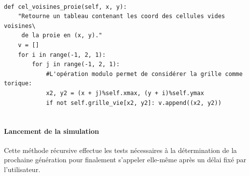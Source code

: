\documentclass[11pt]{article}
\begin{document}
\begin{verbatim}

def cel_voisines_proie(self, x, y):
    "Retourne un tableau contenant les coord des cellules vides voisines\
     de la proie en (x, y)."
    v = []
    for i in range(-1, 2, 1):
        for j in range(-1, 2, 1):
            #L'opération modulo permet de considérer la grille comme torique:
            x2, y2 = (x + j)%self.xmax, (y + i)%self.ymax      
            if not self.grille_vie[x2, y2]: v.append((x2, y2))
                
\end{verbatim}

\paragraph{Lancement de la simulation}
Cette méthode récursive effectue les tests nécessaires à la détermination de la prochaine génération pour finalement s'appeler elle-même après un délai fixé par l'utilisateur.
\end{document}
